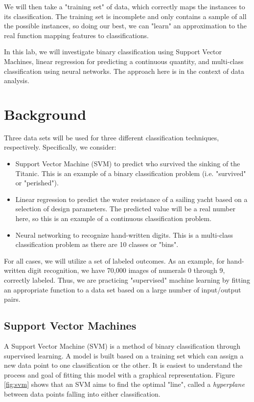 \documentclass[11pt,a4paper]{article}
\begin{document}
We will then take a "training set" of data, which correctly maps the instances to its classification. The training set is incomplete and only contains a sample of all the possible instances, so doing our best, we can "learn" an approximation to the real function mapping features to classifications. 

In this lab, we will investigate binary classification using Support Vector Machines, linear regression for predicting a continuous quantity, and multi-class classification using neural networks. The approach here is in the context of data analysis.

\section{Background}
Three data sets will be used for three different classification techniques, respectively. Specifically, we consider:

\begin{itemize}
\item Support Vector Machine (SVM) to predict who survived the sinking of the Titanic. This is an example of a binary classification problem (i.e. "survived" or "perished").
\item Linear regression to predict the water resistance of a sailing yacht based on a selection of design parameters. The predicted value will be a real number here, so this is an example of a continuous classification problem.
\item Neural networking to recognize hand-written digits. This is a multi-class classification problem as there are 10 classes or "bins".
\end{itemize}

For all cases, we will utilize a set of labeled outcomes. As an example, for hand-written digit recognition, we have 70,000 images of numerals 0 through 9, correctly labeled. Thus, we are practicing "supervised" machine learning by fitting an appropriate function to a data set based on a large number of input/output pairs.

\subsection{Support Vector Machines}
A Support Vector Machine (SVM) is a method of binary classification through supervised learning. A model is built based on a training set which can assign a new data point to one classification or the other. It is easiest to understand the process and goal of fitting this model with a graphical representation. Figure \ref{fig:svm} shows that an SVM aims to find the optimal "line", called a \textit{hyperplane} between data points falling into either classification. 
\end{document}
